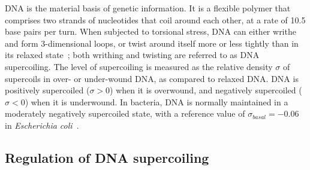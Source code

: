 DNA is the material basis of genetic information.
It is a flexible polymer that comprises two strands of nucleotides that coil around each other, at a rate of 10.5 base pairs per turn.
When subjected to torsional stress, DNA can either writhe and form 3-dimensional loops, or twist around itself more or less tightly than in its relaxed state~\citep{travers2005}; both writhing and twisting are referred to as DNA supercoiling.
The level of supercoiling is measured as the relative density $\sigma$ of supercoils in over- or under-wound DNA, as compared to relaxed DNA.
DNA is positively supercoiled ($\sigma > 0$) when it is overwound, and negatively supercoiled ($\sigma < 0$) when it is underwound.
In bacteria, DNA is normally maintained in a moderately negatively supercoiled state, with a reference value of $\sigma_{basal}=-0.06$ in \emph{Escherichia coli}~\citep{travers2005}.

\subsection{Regulation of DNA supercoiling}

